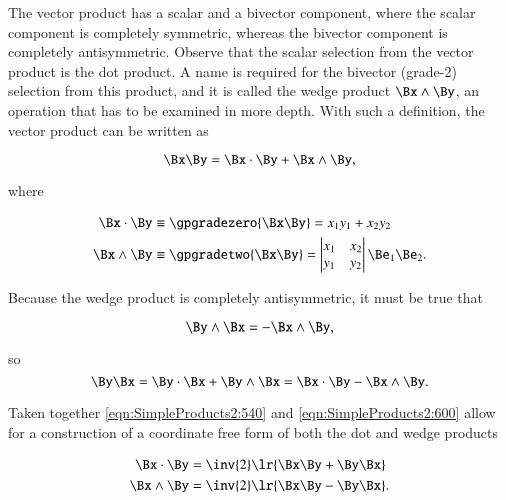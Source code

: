 The vector product has a scalar and a bivector component, where the scalar component is completely symmetric, whereas the bivector component is completely antisymmetric.  Observe that the scalar selection from the vector product is the dot product.  A name is required for the bivector (grade-2) selection from this product, and it is called the wedge product \( \Bx \wedge \By \), an operation that has to be examined in more depth.  With such a definition, the vector product can be written as

\begin{dmath}\label{eqn:SimpleProducts2:540}
\Bx \By
= \Bx \cdot \By + \Bx \wedge \By,
\end{dmath}

where

\begin{dmath}\label{eqn:SimpleProducts2:560}
\begin{aligned}
\Bx \cdot \By &\equiv \gpgradezero{\Bx\By} = x_1 y_1 + x_2 y_2 \\
\Bx \wedge \By &\equiv \gpgradetwo{\Bx\By} =
\begin{vmatrix}
   x_1 & x_2 \\
   y_1 & y_2
\end{vmatrix}
   \Be_1 \Be_2. \\
\end{aligned}
\end{dmath}

Because the wedge product is completely antisymmetric, it must be true that

\begin{dmath}\label{eqn:SimpleProducts2:580}
\By \wedge \Bx = -\Bx \wedge \By,
\end{dmath}

so
\begin{dmath}\label{eqn:SimpleProducts2:600}
\By \Bx
= \By \cdot \Bx + \By \wedge \Bx
= \Bx \cdot \By - \Bx \wedge \By.
\end{dmath}

Taken together \cref{eqn:SimpleProducts2:540} and \cref{eqn:SimpleProducts2:600} allow for a construction of a coordinate free form of both the dot and wedge products

\begin{dmath}\label{eqn:SimpleProducts2:620}
\begin{aligned}
\Bx \cdot \By   &= \inv{2}\lr{ \Bx \By + \By \Bx } \\
\Bx \wedge \By  &= \inv{2}\lr{ \Bx \By - \By \Bx }.
\end{aligned}
\end{dmath}

